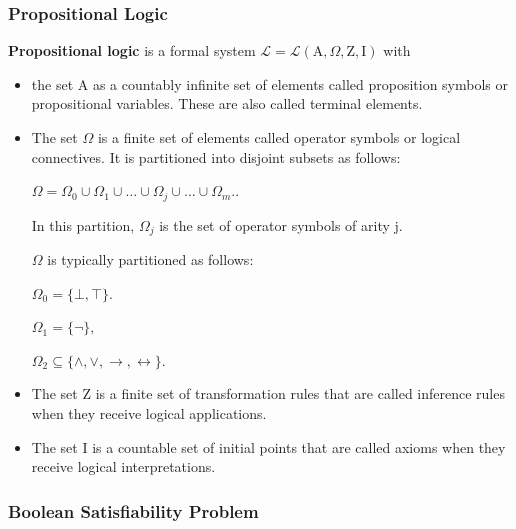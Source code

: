 \documentclass[a4paper, 12pt, bibliography=totoc]{scrartcl}
\begin{document}
\subsubsection{Propositional Logic}
\textbf{Propositional logic} is a formal system $\mathcal{L} = \mathcal{L}(\mathrm {A},\Omega, \mathrm{Z}, \mathrm{I})$ with
\begin{itemize}
	\item the set $\mathrm {A}$ as a countably infinite set of elements called proposition symbols or propositional variables. These are also called terminal elements.
	\item The set $\Omega$ is a finite set of elements called operator symbols or logical connectives. It is partitioned into disjoint subsets as follows:
	
	$\Omega =\Omega _{0}\cup \Omega _{1}\cup \ldots \cup \Omega _{j}\cup \ldots \cup \Omega _{m}.$.
	
	In this partition, $\Omega _{j}$ is the set of operator symbols of arity j.
	
	$\Omega$ is typically partitioned as follows:
	
	${ \Omega _{0}=\{\bot ,\top \}.}$ 
	
	${\Omega _{1}=\{\lnot \},}$
	
	${ \Omega _{2}\subseteq \{\land ,\lor ,\to ,\leftrightarrow \}.}$

	\item The set $\mathrm {Z}$ is a finite set of transformation rules that are called inference rules when they receive logical applications.
	
	\item The set $\mathrm {I}$ is a countable set of initial points that are called axioms when they receive logical interpretations.
\end{itemize}
\subsubsection{Boolean Satisfiability Problem}\label{sec:BSP}

\end{document}

